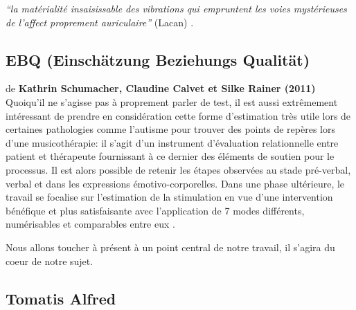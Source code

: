 \textsf{\textit{``la matérialité insaisissable
  des vibrations qui empruntent  les voies mystérieuses de
l'affect proprement auriculaire''}
(Lacan)}
\autocite[ch. 13]{auriol:cle}.





\subsection{EBQ (Einschätzung Beziehungs Qualität)}
de \textbf{Kathrin Schumacher, Claudine Calvet et Silke Rainer (2011)}
Quoiqu'il ne s'agisse pas à proprement parler de test, il est aussi
extrêmement intéressant de prendre en  considération cette forme
d'estimation très
utile lors de certaines pathologies comme l'autisme pour trouver des
points de repères lors d'une musicothérapie: il s'agit d'un instrument d'évaluation relationnelle entre patient et
thérapeute fournissant à ce dernier des éléments de soutien pour le
processus.
Il est alors possible de retenir les étapes
observées au stade pré-verbal, verbal et dans les expressions
émotivo-corporelles.
Dans une phase ultérieure, le travail se focalise sur l'estimation de
la stimulation en vue d'une intervention bénéfique et plus
satisfaisante avec l'application de 7 modes différents, numérisables
et comparables entre eux \autocite{EBQ-key}.

Nous allons toucher à présent à un point central de notre travail, il
s'agira du coeur de notre sujet.

\subsection{Tomatis Alfred}

